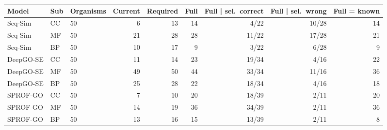 \begin{tabular}{lllrrrrrr}
\toprule
Model & Sub & Organisms & Current & Required & Full & Full | sel.\ correct & Full | sel.\ wrong & Full = known \\
\midrule
Seq-Sim & CC & 50 & 6 & 13 & 14 & 4/22 & 10/28 & 14 \\
\addlinespace
Seq-Sim & MF & 50 & 21 & 28 & 28 & 11/22 & 17/28 & 21 \\
\addlinespace
Seq-Sim & BP & 50 & 10 & 17 & 9 & 3/22 & 6/28 & 9 \\
\midrule
DeepGO-SE & CC & 50 & 11 & 14 & 23 & 19/34 & 4/16 & 22 \\
\addlinespace
DeepGO-SE & MF & 50 & 49 & 50 & 44 & 33/34 & 11/16 & 36 \\
\addlinespace
DeepGO-SE & BP & 50 & 25 & 28 & 22 & 18/34 & 4/16 & 18 \\
\midrule
SPROF-GO & CC & 50 & 7 & 10 & 20 & 18/39 & 2/11 & 20 \\
\addlinespace
SPROF-GO & MF & 50 & 14 & 19 & 36 & 34/39 & 2/11 & 36 \\
\addlinespace
SPROF-GO & BP & 50 & 13 & 16 & 15 & 13/39 & 2/11 & 8 \\
\bottomrule
\end{tabular}
